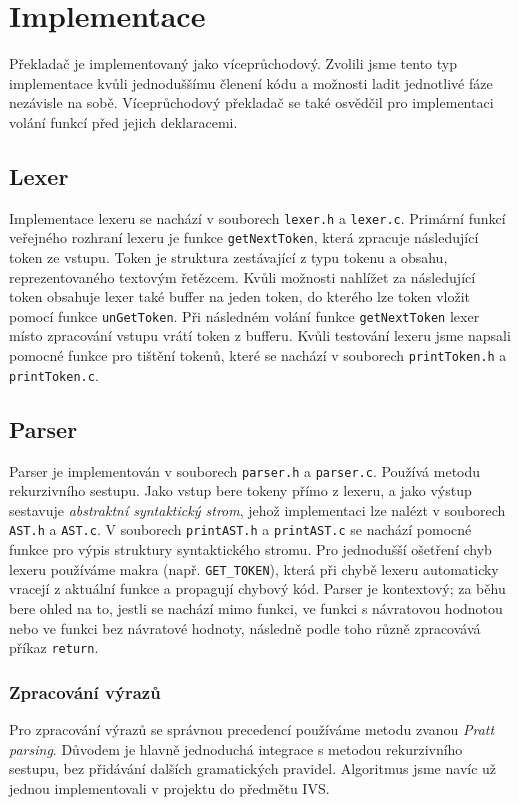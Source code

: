\section{Implementace}
Překladač je implementovaný jako víceprůchodový.
Zvolili jsme tento typ implementace kvůli jednoduššímu členení kódu a možnosti ladit jednotlivé fáze nezávisle na sobě.
Víceprůchodový překladač se také osvědčil pro implementaci volání funkcí před jejich deklaracemi.

\subsection{Lexer}
Implementace lexeru se nachází v souborech \texttt{lexer.h} a \texttt{lexer.c}.
Primární funkcí veřejného rozhraní lexeru je funkce \texttt{getNextToken},
která zpracuje následující token ze vstupu.
Token je struktura zestávající z typu tokenu a obsahu, reprezentovaného textovým řetězcem.
Kvůli možnosti nahlížet za následující token obsahuje lexer také buffer na jeden token,
do kterého lze token vložit pomocí funkce \texttt{unGetToken}.
Při následném volání funkce \texttt{getNextToken} lexer místo zpracování vstupu vrátí token z bufferu.
Kvůli testování lexeru jsme napsali pomocné funkce pro tištění tokenů,
které se nachází v souborech \texttt{printToken.h} a \texttt{printToken.c}.

\subsection{Parser}
Parser je implementován v souborech \texttt{parser.h} a \texttt{parser.c}.
Používá metodu rekurzivního sestupu.
Jako vstup bere tokeny přímo z lexeru, a jako výstup sestavuje \textit{abstraktní syntaktický strom},
jehož implementaci lze nalézt v souborech \texttt{AST.h} a \texttt{AST.c}.
V souborech \texttt{printAST.h} a \texttt{printAST.c} se nachází pomocné funkce pro výpis struktury syntaktického stromu.
Pro jednodušší ošetření chyb lexeru používáme makra (např. \texttt{GET\_TOKEN}),
která při chybě lexeru automaticky vracejí z aktuální funkce a propagují chybový kód.
Parser je kontextový; za běhu bere ohled na to, jestli se nachází mimo funkci,
ve funkci s návratovou hodnotou nebo ve funkci bez návratové hodnoty,
následně podle toho různě zpracovává příkaz \texttt{return}.

\subsubsection{Zpracování výrazů}
Pro zpracování výrazů se správnou precedencí používáme metodu zvanou \textit{Pratt parsing}.
Důvodem je hlavně jednoduchá integrace s metodou rekurzivního sestupu, bez přidávání dalších gramatických pravidel.
Algoritmus jsme navíc už jednou implementovali v projektu do předmětu IVS.

